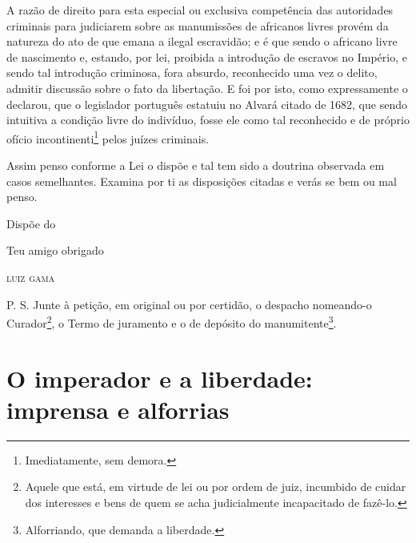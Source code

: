 A razão de direito para esta especial ou exclusiva competência das
autoridades criminais para judiciarem sobre as manumissões de africanos
livres provém da natureza do ato de que emana a ilegal escravidão; e é
que sendo o africano livre de nascimento e, estando, por lei, proibida a
introdução de escravos no Império, e sendo tal introdução criminosa,
fora absurdo, reconhecido uma vez o delito, admitir discussão sobre o
fato da libertação. E foi por isto, como expressamente o declarou, que o
legislador português estatuiu no Alvará citado de 1682, que sendo
intuitiva a condição livre do indivíduo, fosse ele como tal reconhecido
e de próprio ofício incontinenti\footnote{ Imediatamente, sem demora.}
pelos juízes criminais.

Assim penso conforme a Lei o dispõe e tal tem sido a doutrina observada
em casos semelhantes. Examina por ti as disposições citadas e verás se
bem ou mal penso.

\begin{flushright}
Dispõe do

Teu amigo obrigado

\textsc{luiz gama}
\end{flushright}

P. S. Junte à petição, em original ou por certidão, o despacho
nomeando-o Curador\footnote{ Aquele que está, em virtude de lei ou por
  ordem de juiz, incumbido de cuidar dos interesses e bens de quem se
  acha judicialmente incapacitado de fazê-lo.}, o Termo de juramento e o
de depósito do manumitente\footnote{ Alforriando, que demanda a
  liberdade.}.

\part{O imperador e a liberdade: imprensa e alforrias}

